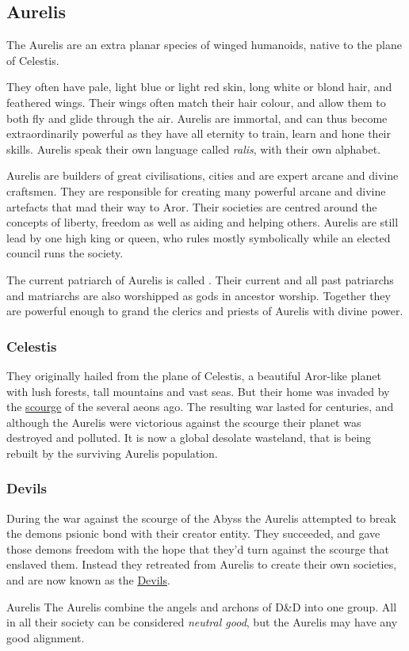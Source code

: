 \subsection{Aurelis}
\label{sec:Aurelis}

The Aurelis are an extra planar species of winged humanoids, native to the plane
of Celestis.

They often have pale, light blue or light red skin, long white or blond hair,
and feathered wings. Their wings often match their hair colour, and allow them
to both fly and glide through the air. Aurelis are immortal, and can thus become
extraordinarily powerful as they have all eternity to train, learn and hone
their skills. Aurelis speak their own language called \emph{ralis}, with
their own alphabet.

Aurelis are builders of great civilisations, cities and are expert arcane and
divine craftsmen. They are responsible for creating many powerful arcane and
divine artefacts that mad their way to Aror. Their societies are centred
around the concepts of liberty, freedom as well as aiding and helping
others. Aurelis are still lead by one high king or queen, who rules mostly
symbolically while an elected council runs the society.

The current patriarch of Aurelis is called . Their current
and all past patriarchs and matriarchs are also worshipped as gods in ancestor
worship. Together they are powerful enough to grand the clerics and priests
of Aurelis with divine power.

\subsubsection{Celestis}
\label{sec:Celestis}

They originally hailed from the plane of Celestis, a beautiful Aror-like planet
with lush forests, tall mountains and vast seas. But their home
was invaded by the \hyperref[sec:Scourge]{scourge} of the 
several aeons ago. The resulting war lasted for centuries, and although the
Aurelis were victorious against the scourge their planet was destroyed and
polluted. It is now a global desolate wasteland, that is being rebuilt by the
surviving Aurelis population.

\subsubsection{Devils}

During the war against the scourge of the Abyss the Aurelis attempted to break
the demons psionic bond with their creator entity. They succeeded, and gave
those demons freedom with the hope that they'd turn against the scourge that
enslaved them. Instead they retreated from Aurelis to create their own
societies, and are now known as the \hyperref[sec:devils]{Devils}.

\begin{35e}{Aurelis}
  The Aurelis combine the angels and archons of D&D into one group. All in all
  their society can be considered \emph{neutral good}, but the Aurelis may have
  any good alignment.
\end{35e}
